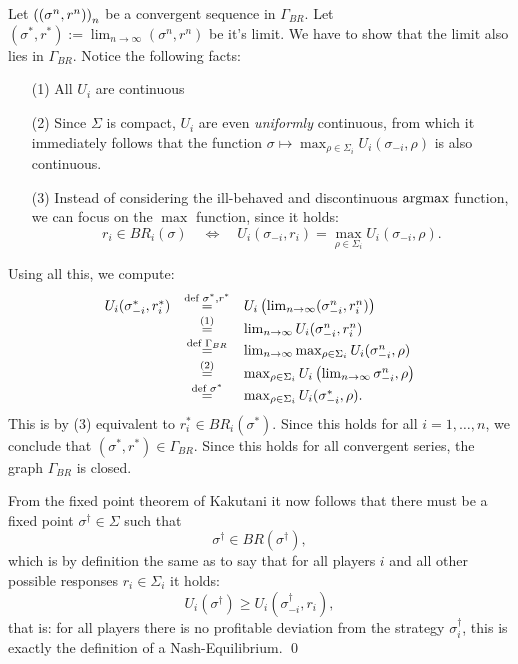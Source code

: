 \documentclass{scrartcl}
\begin{document}
Let $\left((\sigma^n, r^n)\right)_n$ be a convergent sequence in $\Gamma_{BR}$.
Let $(\sigma^\ast, r^\ast) := \lim_{n\to\infty}(\sigma^n, r^n)$ be it's limit. 
We have to show that the limit also lies in $\Gamma_{BR}$.
Notice the following facts:
\begin{itemize}
  \item[(1)] All $U_i$ are continuous 
  \item[(2)] Since $\Sigma$ is compact, $U_i$ are even \emph{uniformly}
    continuous, from which it immediately follows that the function
    $\sigma \mapsto \max_{\rho\in\Sigma_i}U_i(\sigma_{-i}, \rho)$ 
    is also continuous.
  \item[(3)] Instead of considering the ill-behaved and discontinuous 
    $\operatorname{argmax}$ function, we can focus on the $\max$ function, since it holds:
    \[
      r_i \in BR_i(\sigma) \quad \Leftrightarrow \quad 
      U_i(\sigma_{-i}, r_i) = \max_{\rho\in\Sigma_i} U_i(\sigma_{-i}, \rho).
    \]
\end{itemize}
Using all this, we compute:
\[
  \begin{array}{ccl}
  U_i(\sigma^\ast_{-i}, r^\ast_i) 
    &\overset{\textrm{def } \sigma^\ast, r^\ast}= &
    U_i\left(\lim_{n\to\infty}(\sigma^n_{-i}, r^n_i)\right) \\
    &\overset{(1)}= &
    \lim_{n\to\infty}U_i(\sigma^n_{-i}, r^n_i) \\
    &\overset{\textrm{def } \Gamma_{BR}}= &
    \lim_{n\to\infty}\max_{\rho\in\Sigma_i}U_i(\sigma^n_{-i}, \rho) \\
    &\overset{(2)}= &
    \max_{\rho\in\Sigma_i}U_i\left(\lim_{n\to\infty}\sigma^n_{-i}, \rho\right) \\
    &\overset{\textrm{def } \sigma^\ast}= &
    \max_{\rho\in\Sigma_i}U_i(\sigma^\ast_{-i}, \rho).
  \end{array}
\]
This is by (3) equivalent to $r^\ast_i\in BR_i(\sigma^\ast)$. Since this 
holds for all $i=1,\dots,n$, we conclude that 
$(\sigma^\ast, r^\ast) \in \Gamma_{BR}$. Since this holds for all convergent
series, the graph $\Gamma_{BR}$ is closed.

 From the fixed point theorem of Kakutani it now follows 
that there must be a fixed point $\sigma^\dagger\in\Sigma$ such that 
\[
  \sigma^\dagger \in BR(\sigma^\dagger),
\]
which is by definition the same as to say that for all players $i$ and 
all other possible responses $r_i \in \Sigma_i$ it holds:
\[
   U_i(\sigma^\dagger) \geq U_i(\sigma^\dagger_{-i}, r_i),
\]
that is: for all players there is no profitable deviation from the strategy 
$\sigma^\dagger_i$, this is exactly the definition of a Nash-Equilibrium.
\hfill \qed
\end{document}
